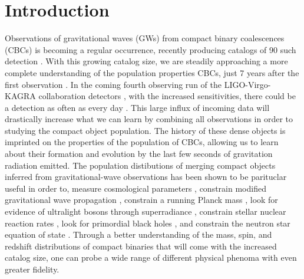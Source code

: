 \section{Introduction} \label{sec:intro}

Observations of gravitational waves (GWs) from compact binary coalescences (CBCs) is becoming a regular occurrence, 
recently producing catalogs of 90 such detection \cite{GWTC1,gwtc2,GWTC3}. With this growing catalog size, we are steadily approaching a more complete  
understanding of the population properties CBCs, just 7 years after the first observation \cite{o1o2_pop,o3a_pop,o3b_astro_dist}. 
In the coming fourth observing run of the LIGO-Virgo-KAGRA collaboration detectors \citep{aLIGO,aVIRGO}, with the increased sensitivities, 
there could be a detection as often as every day \cite{LVK_prospects}. This large influx of incoming data will drastically increase what we can learn by combining all observations
in order to studying the compact object population. The history of these dense objects is imprinted on the properties of the population 
of CBCs, allowing us to learn about their formation and evolution by the last few seconds of gravitation radiation emitted. The population distibutions 
of merging compact objects inferred from gravitational-wave observations has been shown to be parituclar useful in order to, measure cosmological parameters \citep{Farr_2019HUB,gwtc3_cosmo}, 
constrain modified gravitational wave propagation \citep{ModGWProp,ModGWProp2}, constrain a running Planck mass \citep{Lagos_runningPlanckMass}, look for evidence of ultralight bosons through superradiance \citep{Ng_Boson2021,GWTC2_superradiance_Ng}, 
constrain stellar nuclear reaction rates \citep{Farmer_2019,Farmer_2020}, look for primordial black holes \citep{Ng_2021,KenNgPBH2022}, and constrain the neutron star equation of state \citep{Golomb_EOS}. 
Through a better understanding of the mass, spin, and redshift distributions of compact binaries that will come with the increased catalog size, 
one can probe a wide range of different physical phenoma with even greater fidelity. 

